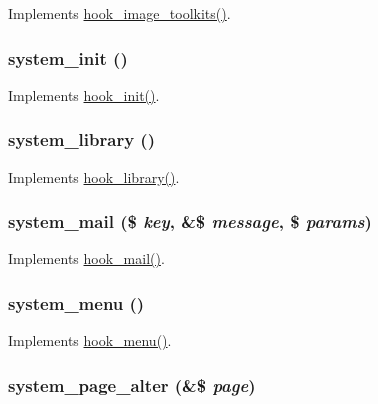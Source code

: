 \label{system_8module_ac5de4c1bb1b8395a6a074df170cbe335}
Implements \hyperlink{group__hooks_ga9abe202036afcc6a3cc97ccc2c13ab29}{hook\_\-image\_\-toolkits()}. \hypertarget{system_8module_ac6847a570b3e5f0fbda1802e90d066aa}{
\subsubsection[{system\_\-init}]{\setlength{\rightskip}{0pt plus 5cm}system\_\-init ()}}
\label{system_8module_ac6847a570b3e5f0fbda1802e90d066aa}
Implements \hyperlink{group__hooks_ga74edef0c463436fdbb1f92ef367db051}{hook\_\-init()}. \hypertarget{system_8module_a7f680fce0aaf48a96f122edf5345097f}{
\subsubsection[{system\_\-library}]{\setlength{\rightskip}{0pt plus 5cm}system\_\-library ()}}
\label{system_8module_a7f680fce0aaf48a96f122edf5345097f}
Implements \hyperlink{group__hooks_ga6bf3f83fa2e373836f5aa78fd143d1cd}{hook\_\-library()}. \hypertarget{system_8module_a33bdb754ad2acfe55063e5114d05a68b}{
\subsubsection[{system\_\-mail}]{\setlength{\rightskip}{0pt plus 5cm}system\_\-mail (\$ {\em key}, \/  \&\$ {\em message}, \/  \$ {\em params})}}
\label{system_8module_a33bdb754ad2acfe55063e5114d05a68b}
Implements \hyperlink{group__hooks_gacdeb1cba0d0a86ac4de3fff7d4765777}{hook\_\-mail()}. \hypertarget{system_8module_ae25cda0ea4fd63936e8f955dd9cfc269}{
\subsubsection[{system\_\-menu}]{\setlength{\rightskip}{0pt plus 5cm}system\_\-menu ()}}
\label{system_8module_ae25cda0ea4fd63936e8f955dd9cfc269}
Implements \hyperlink{group__hooks_ga5c95244fea59b25666e409759e133ded}{hook\_\-menu()}. \hypertarget{system_8module_accbb83043437c6d64b3c11d32104459e}{
\subsubsection[{system\_\-page\_\-alter}]{\setlength{\rightskip}{0pt plus 5cm}system\_\-page\_\-alter (\&\$ {\em page})}}
